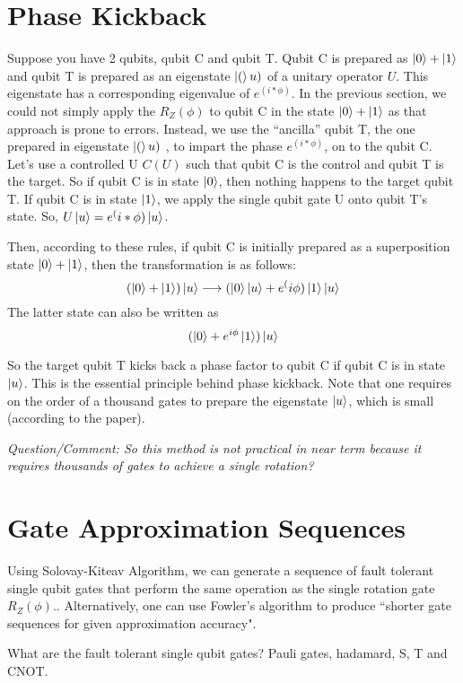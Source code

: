 \documentclass{article}
\begin{document}
\section{Phase Kickback}

Suppose you have 2 qubits, qubit C and qubit T. Qubit C is prepared as
 \(\ket{0}+\ket{1}\) and qubit T is prepared as
an eigenstate \(\ket(u)\) of a unitary operator \(U\). This eigenstate has
a corresponding eigenvalue of \(e^(i*\phi)\). In the previous section,
we could not simply apply the \(R_Z(\phi)\) to qubit C in the state
\(\ket{0}+\ket{1}\) as that approach is prone to
errors.
Instead, we use the ``ancilla'' qubit T, the one prepared in eigenstate \(\ket(u)\) ,
to impart the phase \(e^(i*\phi)\), on to the qubit C. Let's use a controlled U \(C(U)\)
such that qubit C is the control and qubit T is the target.
So if qubit C is in state \(\ket{0}\), then nothing happens to the
target qubit T. If qubit C is in state \(\ket{1}\), we apply the single qubit gate
U onto qubit T's state. So, \(U\ket{u} = e^(i*\phi)\ket{u}\).

Then, according to these rules, if qubit C is initially prepared as a superposition
state \(\ket{0}+\ket{1}\), then the transformation is as follows:
\[(\ket{0}+\ket{1})\ket{u}  \longrightarrow (\ket{0}\ket{u}+ e^(i\phi)\ket{1}
\ket{u}\]
The latter state can also be written as
\[(\ket{0}+e^{i\phi}\ket{1})\ket{u} \]

So the target qubit T kicks back a phase factor to qubit C if qubit C is in
state \(\ket{u}\). This is the essential principle behind phase kickback. Note
that one requires on the order of a thousand gates to prepare the eigenstate
\(\ket{u}\), which is small (according to the paper).

\textit{Question/Comment: So this method is not practical in near term because it requires
thousands of gates to achieve a single rotation?}

\section{Gate Approximation Sequences}
Using Solovay-Kiteav Algorithm, we can generate a sequence of fault tolerant
single qubit gates that perform the same operation as the single rotation gate
\(R_Z(\phi)\).. Alternatively, one can
use Fowler's algorithm to produce ``shorter gate sequences for given
approximation accuracy".

What are the fault tolerant single qubit gates? Pauli gates, hadamard, S, T
and CNOT.
\end{document}

